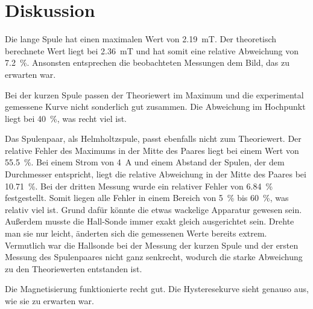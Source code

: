 \section{Diskussion}
\label{sec:Diskussion}

Die lange Spule hat einen maximalen Wert von \SI{2.19}{\milli\tesla}. Der theoretisch berechnete Wert liegt bei %
\SI{2.36}{\milli\tesla} und hat somit eine relative Abweichung von \SI{7.2}{\percent}. Ansonsten entsprechen die 
beobachteten Messungen dem Bild, das zu erwarten war.

\noindent Bei der kurzen Spule passen der Theoriewert im Maximum und die experimental gemessene Kurve nicht sonderlich gut zusammen. Die Abweichung im 
Hochpunkt liegt bei \SI{40}{\percent}, was recht viel ist. 

\noindent Das Spulenpaar, als Helmholtzspule, passt ebenfalls nicht zum Theoriewert. Der relative Fehler des Maximums in der Mitte 
des Paares liegt bei einem Wert von \SI{55.5}{\percent}. %
Bei einem Strom von \SI{4}{\ampere} und einem Abstand der Spulen, der dem Durchmesser entspricht, liegt die relative Abweichung in der Mitte des Paares bei \SI{10.71}{\percent}. %
Bei der dritten Messung wurde ein %
relativer Fehler von \SI{6.84}{\percent} festgestellt. Somit liegen alle Fehler in einem Bereich von \SI{5}{\percent} 
bis \SI{60}{\percent}, was relativ viel ist. Grund dafür könnte die etwas wackelige Apparatur gewesen sein. %
Außerdem musste die Hall-Sonde immer exakt gleich ausgerichtet sein. Drehte man sie nur leicht, änderten sich die %
gemessenen Werte bereits extrem.
\newline
Vermutlich war die Hallsonde bei der Messung der kurzen Spule und der ersten Messung %
des Spulenpaares nicht ganz senkrecht, wodurch die starke Abweichung zu den Theoriewerten entstanden ist. 

\noindent Die Magnetisierung funktionierte recht gut. Die Hysteresekurve sieht genauso aus, wie sie zu erwarten war. %
